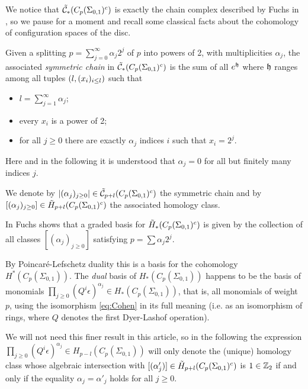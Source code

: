We notice that $\tilde{\mathcal{C}}_*(C_p(\Sigma_{0,1})^c)$ is exactly the chain complex described by Fuchs in
\cite{Fuchs:CohomBraidModtwo}, so we pause for a moment and
recall some classical facts about the cohomology of configuration
spaces of the disc.
\begin{defn}
\label{defn:symchain}
Given a splitting $p=\sum_{j=0}^{\infty}\alpha_j2^j$ of $p$ into powers of 2, with multiplicities $\alpha_j$,
the associated \emph{symmetric chain} in $\tilde{\mathcal{C}}_*(C_p(\Sigma_{0,1})^c)$
is the sum of all $e^{\mathfrak{h}}$ where $\mathfrak{h}$ ranges among all tuples
$\left(l,(x_i)_{i\leq l}\right)$ such that
\begin{itemize}
 \item $l=\sum_{j=1}^{\infty}\alpha_j$;
 \item every $x_i$ is a power of 2;
 \item for all $j\geq 0$ there are exactly $\alpha_j$ indices $i$ such that $x_i=2^j$.
\end{itemize}
Here and in the following it is understood that $\alpha_j=0$ for all but finitely many indices $j$.

We denote by $|(\alpha_j)_{j\geq 0}|\in\tilde{\mathcal{C}}_{p+l}(C_p(\Sigma_{0,1})^c)$ the symmetric chain
and by $[(\alpha_j)_{j\geq 0}]\in\tilde{H}_{p+l}(C_p(\Sigma_{0,1})^c)$ the associated homology class.
\end{defn}
In \cite{Fuchs:CohomBraidModtwo} Fuchs shows that a graded basis for $\tilde{H}_*(C_p(\Sigma_{0,1})^c)$
is given by the collection of all classes $[(\alpha_j)_{j\geq 0}]$ satisfying $p=\sum\alpha_j2^j$.

By Poincaré-Lefschetz duality this is a basis for the cohomology $H^*(C_p(\Sigma_{0,1}))$.
The \emph{dual} basis of $H_*(C_p(\Sigma_{0,1}))$
happens to be the basis of monomials
$\prod_{j\geq 0}(Q^i\epsilon)^{\alpha_j}\in H_*(C_p(\Sigma_{0,1}))$, that is, all monomials
of weight $p$, using
the isomorphism \ref{eq:Cohen} in its full meaning (i.e. as an isomorphism of rings,
where $Q$ denotes the first Dyer-Lashof operation).


We will not need this finer result in this article, so in the following the expression
$\prod_{j\geq 0}(Q^i\epsilon)^{\alpha_j}\in H_{p-l}(C_p(\Sigma_{0,1}))$ will only denote
the (unique) homology class whose algebraic intersection with $[(\alpha'_j)]\in\tilde{H}_{p+l}(C_p(\Sigma_{0,1})^c)$
is $1\in\mathbb{Z}_2$ if and only if the equality $\alpha_j=\alpha'_j$ holds for all $j\geq 0$.

